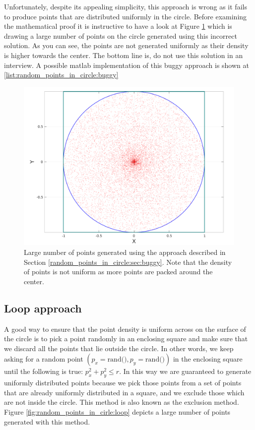 Unfortunately, despite its appealing simplicity, this approach is wrong as it fails to produce points that are  distributed uniformly in the circle. Before examining the mathematical proof it is instructive to have a look at Figure \ref{fig:random_points_in_cirle:buggy} which is drawing a large number of points on the circle generated using this incorrect solution. As you can see,  the points are not generated uniformly as their density is higher towards the center. 
The bottom line is, do not use this solution in an interview. A possible matlab implementation of this buggy approach is shown at \ref{list:random_points_in_circle:buggy}



\begin{figure}
	\label{fig:random_points_in_cirle:buggy}
	\centering
	\includegraphics[scale=0.3]{sources/random_points_in_circle/images/buggy_points}
	\caption{Large number of points generated using the approach described in Section \ref{random_points_in_circle:sec:buggy}. Note that the density of points is not uniform as more points are packed around the center.}
\end{figure}

\subsection{Loop approach}
\label{random_points_in_circle:sec:loop}
A good way to ensure that the point density is uniform across on the surface of the circle is to pick a point randomly in an enclosing square and make sure that we discard all the points that lie outside the circle. In other words, we keep asking for a random point $(p_x=\text{rand()}, p_y=\text{rand()})$ in the enclosing square until the following is true: $p_x^2 + p_y^2 \leq r$. In this way we are guaranteed to generate uniformly distributed points because we pick those points from a set of points that are already uniformly distributed in a square, and we exclude those which are not inside the circle. This method is also known as the exclusion method. Figure \ref{fig:random_points_in_cirle:loop} depicts a large number of points generated with this method.

